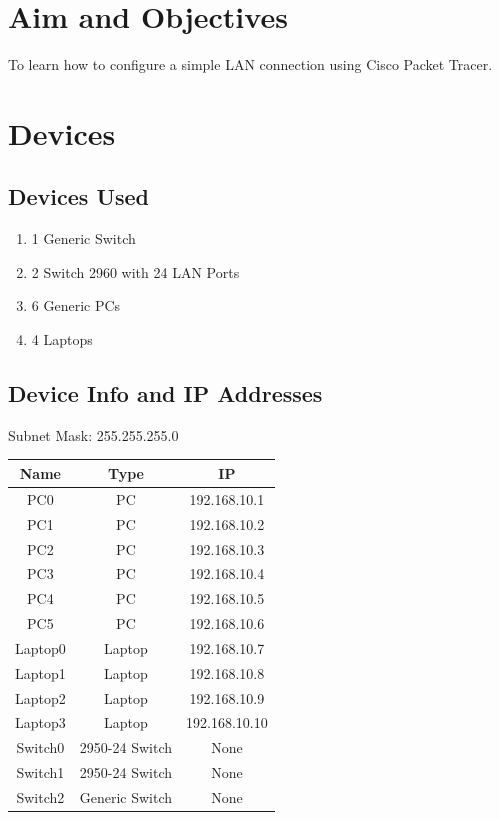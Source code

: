 \documentclass[11pt]{article}
\begin{document}
	
\tableofcontents
\thispagestyle{empty}
\clearpage


\setcounter{page}{1}

\section{Aim and Objectives}
To learn how to configure a simple LAN connection using Cisco Packet Tracer.

\section{Devices}

\subsection{Devices Used}
\begin{enumerate}
	\item 1 Generic Switch
	\item 2 Switch 2960 with 24 LAN Ports
	\item 6 Generic PCs
	\item 4 Laptops
\end{enumerate}

\subsection{Device Info and IP Addresses}

Subnet Mask: 255.255.255.0

\begin{table}[H] 
	\centering
	\begin{tabular}{|c|c|c|}
	\hline
	\textbf{Name} & \textbf{Type}      & \textbf{IP}    \\ 
	\hline
	PC0           & PC                 & 192.168.10.1   \\ 
	\hline
	PC1           & PC                 & 192.168.10.2   \\ 
	\hline
	PC2           & PC                 & 192.168.10.3   \\ 
	\hline
	PC3           & PC                 & 192.168.10.4   \\ 
	\hline
	PC4           & PC                 & 192.168.10.5   \\ 
	\hline
	PC5           & PC                 & 192.168.10.6   \\ 
	\hline
	Laptop0       & Laptop             & 192.168.10.7   \\ 
	\hline
	Laptop1       & Laptop             & 192.168.10.8   \\ 
	\hline
	Laptop2       & Laptop             & 192.168.10.9   \\ 
	\hline
	Laptop3       & Laptop             & 192.168.10.10  \\ 
	\hline
	Switch0       & 2950-24
					Switch & None           \\ 
	\hline
	Switch1       & 2950-24
					Switch & None           \\ 
	\hline
	Switch2       & Generic
					Switch & None           \\
	\hline
	\end{tabular}
	\end{table}
\end{document}
